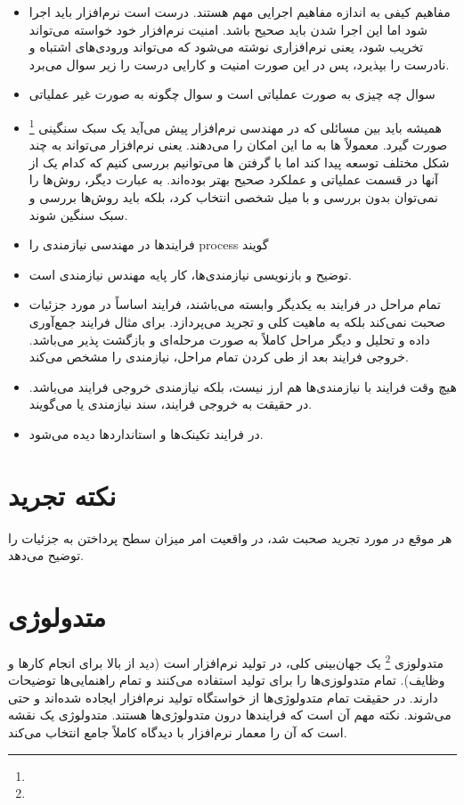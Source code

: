 \begin{itemize}
  \item مفاهیم کیفی به اندازه مفاهیم اجرایی مهم هستند. درست است نرم‌افزار باید
  اجرا شود اما این اجرا شدن باید صحیح باشد. امنیت نرم‌افزار خود خواسته می‌تواند
  تخریب شود، یعنی نرم‌افزاری نوشته می‌شود که می‌تواند ورودی‌های اشتباه و نادرست
  را بپذیرد، پس در این صورت امنیت و کارایی درست را زیر سوال می‌برد.
  \item سوال چه چیزی به صورت عملیاتی است و سوال چگونه به صورت غیر عملیاتی
  \item همیشه باید بین مسائلی که در مهندسی نرم‌افزار پیش می‌آید یک سبک سنگینی
  \footnote{} صورت گیرد. معمولاً  ها به ما این
  امکان را می‌دهند. یعنی نرم‌افزار می‌تواند به چند شکل مختلف توسعه پیدا کند اما
  با گرفتن  ها می‌توانیم بررسی کنیم که کدام یک از آنها در قسمت
  عملیاتی و عملکرد صحیح بهتر بوده‌اند. به عبارت دیگر، روش‌ها را نمی‌توان بدون
  بررسی و با میل شخصی انتخاب کرد، بلکه باید روش‌ها بررسی و سبک سنگین شوند.
  \item فرایند‌ها در مهندسی نیازمندی را process گویند
  \item توضیح و بازنویسی نیازمندی‌ها، کار پایه مهندس نیازمندی است.
  \item تمام مراحل در فرایند به یکدیگر وابسته می‌باشند، فرایند اساساً در مورد
  جزئیات صحبت نمی‌کند بلکه به ماهیت کلی و تجرید می‌پردازد. برای مثال فرایند
  جمع‌آوری داده و تحلیل و دیگر مراحل کاملاً به صورت مرحله‌ای و بازگشت پذیر
  می‌باشد. خروجی فرایند بعد از طی کردن تمام مراحل، نیازمندی را مشخص می‌کند.
  \item هیچ وقت فرایند با نیازمندی‌ها هم ارز نیست، بلکه نیازمندی خروجی فرایند
  می‌باشد. در حقیقت به خروجی فرایند، سند نیازمندی یا  می‌گویند.
  \item در فرایند تکینک‌ها و استاندارد‌ها دیده می‌شود.
\end{itemize}

\section{نکته تجرید}

هر موقع در مورد تجرید صحبت شد، در واقعیت امر میزان سطح پرداختن به جزئیات را
توضیح می‌دهد.

\section{متدولوژی}

متدولوزی \footnote{} یک جهان‌بینی کلی، در تولید نرم‌افزار است
(دید از بالا برای انجام کار‌ها و وظایف). تمام متدولوزی‌ها را برای تولید استفاده
می‌کنند و تمام راهنمایی‌ها توضیحات دارند. در حقیقت تمام متدولوژی‌ها از خواستگاه
تولید نرم‌افزار ایجاده شده‌اند و حتی می‌شوند. نکته مهم آن است که فرایند‌ها درون
متدولوژی‌ها هستند. متدولوژی یک نقشه است که آن را معمار نرم‌افزار با دیدگاه
کاملاً جامع انتخاب می‌کند.

